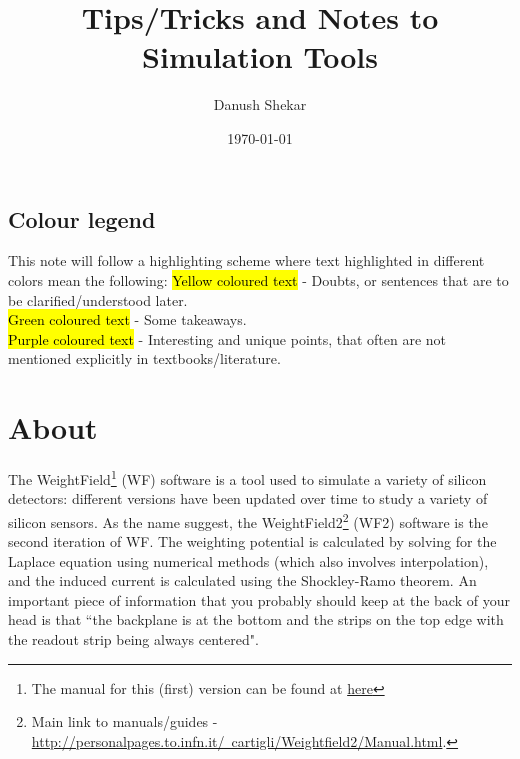 \documentclass[11pt]{article}
\title{Tips/Tricks and Notes to Simulation Tools}
\author{Danush Shekar}
\date{\today}
\newcommand{\hlyellow}[1]{{\sethlcolor{yellow}\hl{#1}}}
\newcommand{\hlgreen}[1]{{\sethlcolor{green2}\hl{#1}}}
\newcommand{\hlred}[1]{{\sethlcolor{red2}\hl{#1}}}
\newcommand{\hlpurple}[1]{{\sethlcolor{purple2}\hl{#1}}}
\begin{document}
\maketitle
\tableofcontents

\newpage


\subsection*{Colour legend}
This note will follow a highlighting scheme where text highlighted in different colors mean the following:
\newline
\hlyellow{Yellow coloured text} - Doubts, or sentences that are to be clarified/understood later.\\
\hlgreen{Green coloured text} - Some takeaways.\\
\hlpurple{Purple coloured text} - Interesting and unique points, that often are not mentioned explicitly in textbooks/literature.\\

\section{About}
The WeightField\footnote{The manual for this (first) version can be found at \href{http://personalpages.to.infn.it/~cartigli/Weightfield2/Manual_files/Manual_Weightfield.pdf}{here}} (WF) software is a tool used to simulate a variety of silicon detectors: different versions have been updated over time to study a variety of silicon sensors. As the name suggest, the WeightField2\footnote{Main link to manuals/guides - \href{http://personalpages.to.infn.it/~cartigli/Weightfield2/Manual.html}{http://personalpages.to.infn.it/~cartigli/Weightfield2/Manual.html}.} (WF2) software is the second iteration of WF. The weighting potential is calculated by solving for the Laplace equation using numerical methods (which also involves interpolation), and the induced current is calculated using the Shockley-Ramo theorem. An important piece of information that you probably should keep at the back of your head is that ``the backplane is at the bottom and the strips on the top edge with the readout strip being always centered".
\end{document}
